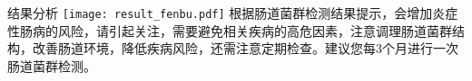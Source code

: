 \vspace*{3mm}
\begin{spacing}{1.1}
\begin{LRaside}[.8]{结果分析}
\noindent
\texttt{[image: result\_fenbu.pdf]}
\asidebreak %
根据肠道菌群检测结果提示，会增加炎症性肠病的风险，请引起关注，需要避免相关疾病的高危因素，注意调理肠道菌群结构，改善肠道环境，降低疾病风险，还需注意定期检查。建议您每3个月进行一次肠道菌群检测。

\end{LRaside}
\end{spacing}

\noindent{}


